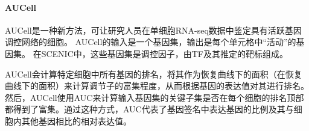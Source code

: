 \paragraph{AUCell}
  AUCell是一种新方法，可让研究人员在单细胞RNA-seq数据中鉴定具有活跃基因调控网络的细胞。 AUCell的输入是一个基因集，输出是每个单元格中“活动”的基因集。 在SCENIC中，这些基因集是调控因子，由TF及其推定的靶标组成。

  AUCell会计算特定细胞中所有基因的排名，将其作为恢复曲线下的面积（在恢复曲线下的面积）来计算调节子的富集程度，从而根据基因的表达值对其进行排名。然后，AUCell使用AUC来计算输入基因集的关键子集是否在每个细胞的排名顶部都得到了富集。通过这种方式，AUC代表了基因签名中表达基因的比例及其与细胞内其他基因相比的相对表达值。

